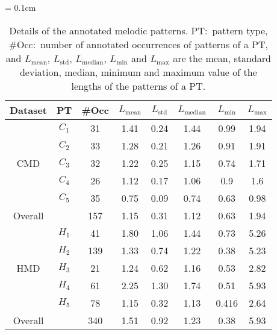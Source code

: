 \begin{table} 
	\centering
	\tabcolsep = 0.1cm
	\renewcommand{\arraystretch}{1}
	\begin{tabular}{ c c|c c c c c c}
		\hline\hline
		Dataset	& PT 	&	\#Occ & $L_{\mathrm{mean}}$ & $L_{\mathrm{std}}$ &	$L_{\mathrm{median}}$ & $L_{\mathrm{min}}$ 	&	$L_{\mathrm{max}}$\\
		\hline
		
		\multirow{5}{*}{CMD} 
		& $C_1$ & 31	&	1.41 & 0.24 &	1.44 &	0.99 	&	1.94	\\ 
		& $C_2$ & 33	&	1.28 & 0.21 &	1.26 &	0.91 	&	1.91\\
		& $C_3$ & 32	&	1.22 & 0.25 &	1.15 &	0.74 	&	1.71\\
		& $C_4$ & 26	&	1.12 & 0.17 &	1.06 &	0.9 	&	1.6\\
		& $C_5$ 	& 35&	0.75 & 0.09 &	0.74 &	0.63 	&	0.98\\
		\hline
		Overall	&  	& 157&	1.15 & 0.31 &	1.12 &	0.63 	&	1.94\\
		\hline\hline 	
		
		\multirow{5}{*}{HMD} 
		&  $H_1$ & 41	&	1.80 & 1.06 &	1.44 &	0.73 	&	5.26	\\ 
		& $H_2$ & 139	&	1.33 & 0.74 &	1.22 &	0.38 	&	5.23 \\
		& $H_3$ & 21	&	1.24 & 0.62 &	1.16 &	0.53 	&	2.82\\
		& $H_4$ & 61	&	2.25 & 1.30 &	1.74 &	0.51 	&	5.93\\
		& $H_5$ & 78	&	1.15 & 0.32 &	1.13 &	0.416 	&	2.64\\
		\hline
		Overall	&  	& 340 &	1.51 & 0.92 &	1.23 &	0.38 	&	5.93\\
		
		\hline\hline        
	\end{tabular}
	\caption{Details of the annotated melodic patterns. PT:~pattern type, \#Occ:~number of annotated occurrences of  patterns of a PT, and $L_{\mathrm{mean}}$, $L_{\mathrm{std}}$, $L_{\mathrm{median}}$, $L_{\mathrm{min}}$ and $L_{\mathrm{max}}$ are the mean, standard deviation, median, minimum and maximum value of the lengths of the patterns of a PT.} \vspace{-1em}
	\label{tab:annotations}
\end{table}


